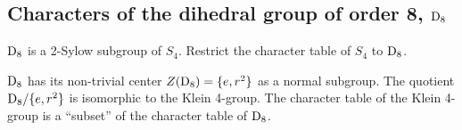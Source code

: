 \subsection{Characters of the dihedral group of order 8, $\text{D}_8$}

$\text{D}_8$ is a 2-Sylow subgroup of $S_4$. Restrict the character table of $S_4$ to $\text{D}_8$. 

$\text{D}_8$ has its non-trivial                                                                                                                                                                                                                                                              center $Z(\text{D}_8) = \{e, r^2\}$ as a normal subgroup. The quotient $\text{D}_8/\{e, r^2\}$ is isomorphic to the Klein 4-group. The character table of the Klein 4-group is a ``subset'' of the character table of $\text{D}_8$.
